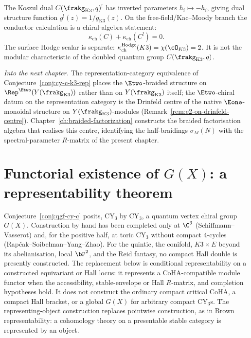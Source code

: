 \begin{remark}
\label{rem:cy-c-koszul-conductor}
The Koszul dual $C(\frakg_{\mathrm{K3}}, q)^!$ has inverted parameters $h_i \mapsto -h_i$, giving dual structure function $g^!(z) = 1/g_{\mathrm{K3}}(z)$. On the free-field/Kac--Moody branch the conductor calculation is a chiral-algebra statement:
\[
\kappa_{\mathrm{ch}}(C)+\kappa_{\mathrm{ch}}(C^!)=0.
\]
The surface Hodge scalar is separate:
\(\kappa_{\mathrm{ch}}^{\mathrm{Hodge}}(K3)=\chi(\cO_{K3})=2\). It is not the modular characteristic of the doubled quantum group \(C(\frakg_{\mathrm{K3}},q)\).

\smallskip
\noindent\textit{Into the next chapter.} The representation-category equivalence of Conjecture~\ref{conj:cy-c-k3-rep} places the $\Etwo$-braided structure on $\Rep^{\Etwo}(Y(\frakg_{\mathrm{K3}}))$ rather than on $Y(\frakg_{\mathrm{K3}})$ itself; the $\Etwo$-chiral datum on the representation category is the Drinfeld centre of the native $\Eone$-monoidal structure on $Y(\frakg_{\mathrm{K3}})$-modules (Remark~\ref{rem:e2-on-drinfeld-centre}). Chapter~\ref{ch:braided-factorization} constructs the braided factorisation algebra that realises this centre, identifying the half-braidings $\sigma_M(N)$ with the spectral-parameter $R$-matrix of the present chapter.
\end{remark}

\section{Functorial existence of \texorpdfstring{$G(X)$}{G(X)}: a representability theorem}
\label{sec:qgf-G-X-representability}

Conjecture~\ref{conj:qgf-cy-c} posits, CY$_3$ by CY$_3$, a quantum
vertex chiral group $G(X)$. Construction by hand has been completed only
at $\C^3$ (Schiffmann--Vasserot) and, for the positive half, at toric
CY$_3$ without compact $4$-cycles (Rap\v{c}ak--Soibelman--Yang--Zhao).
For the quintic, the conifold, $K3\times E$ beyond its abelianisation,
local $\bP^2$, and the Reid fantasy, no compact Hall double is presently
constructed. The replacement below is conditional representability on a
constructed equivariant or Hall locus: it represents a CoHA-compatible
module functor when the accessibility, stable-envelope or Hall
\(R\)-matrix, and completion hypotheses hold. It does
not construct the ordinary compact critical CoHA, a compact Hall
bracket, or a global $G(X)$ for arbitrary compact CY$_3$s.
The representing-object construction replaces pointwise construction,
as in Brown representability: a cohomology theory on a presentable
stable category is represented by an object.

